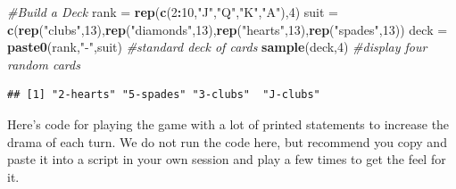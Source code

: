 \documentclass[
]{book}
\newenvironment{Shaded}{\begin{snugshade}}{\end{snugshade}}
\newcommand{\CommentTok}[1]{\textcolor[rgb]{0.56,0.35,0.01}{\textit{#1}}}
\newcommand{\DecValTok}[1]{\textcolor[rgb]{0.00,0.00,0.81}{#1}}
\newcommand{\FunctionTok}[1]{\textcolor[rgb]{0.13,0.29,0.53}{\textbf{#1}}}
\newcommand{\NormalTok}[1]{#1}
\newcommand{\OtherTok}[1]{\textcolor[rgb]{0.56,0.35,0.01}{#1}}
\newcommand{\SpecialCharTok}[1]{\textcolor[rgb]{0.81,0.36,0.00}{\textbf{#1}}}
\newcommand{\StringTok}[1]{\textcolor[rgb]{0.31,0.60,0.02}{#1}}
\theoremstyle{definition}
\theoremstyle{definition}
\theoremstyle{definition}
\theoremstyle{definition}
\theoremstyle{remark}
\begin{document}
\begin{Shaded}
\begin{Highlighting}[]
\CommentTok{\#Build a Deck }
\NormalTok{rank }\OtherTok{=} \FunctionTok{rep}\NormalTok{(}\FunctionTok{c}\NormalTok{(}\DecValTok{2}\SpecialCharTok{:}\DecValTok{10}\NormalTok{,}\StringTok{"J"}\NormalTok{,}\StringTok{"Q"}\NormalTok{,}\StringTok{"K"}\NormalTok{,}\StringTok{"A"}\NormalTok{),}\DecValTok{4}\NormalTok{)}
\NormalTok{suit }\OtherTok{=} \FunctionTok{c}\NormalTok{(}\FunctionTok{rep}\NormalTok{(}\StringTok{"clubs"}\NormalTok{,}\DecValTok{13}\NormalTok{),}\FunctionTok{rep}\NormalTok{(}\StringTok{"diamonds"}\NormalTok{,}\DecValTok{13}\NormalTok{),}\FunctionTok{rep}\NormalTok{(}\StringTok{"hearts"}\NormalTok{,}\DecValTok{13}\NormalTok{),}\FunctionTok{rep}\NormalTok{(}\StringTok{"spades"}\NormalTok{,}\DecValTok{13}\NormalTok{))}
\NormalTok{deck }\OtherTok{=} \FunctionTok{paste0}\NormalTok{(rank,}\StringTok{"{-}"}\NormalTok{,suit) }\CommentTok{\#standard deck of cards}
\FunctionTok{sample}\NormalTok{(deck,}\DecValTok{4}\NormalTok{) }\CommentTok{\#display four random cards}
\end{Highlighting}
\end{Shaded}

\begin{verbatim}
## [1] "2-hearts" "5-spades" "3-clubs"  "J-clubs"
\end{verbatim}

Here's code for playing the game with a lot of printed statements to increase the drama of each turn. We do not run the code here, but recommend you copy and paste it into a script in your own session and play a few times to get the feel for it.
\end{document}
